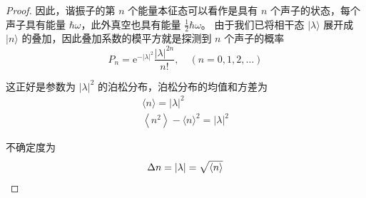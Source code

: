 \begin{proof}
因此，谐振子的第 $n$ 个能量本征态可以看作是具有 $n$ 个声子的状态，每个声子具有能量 $\hbar \omega$，此外真空也具有能量 $\frac{1}{2} \hbar \omega$。
由于我们已将相干态 $|\lambda\rangle$ 展开成 $|n\rangle$ 的叠加，因此叠加系数的模平方就是探测到 $n$ 个声子的概率
$$P_{n}=\mathrm{e}^{-|\lambda|^{2}} \frac{|\lambda|^{2n}}{n!}, \quad(n=0,1,2, \ldots)$$

这正好是参数为 $|\lambda|^{2}$ 的泊松分布，泊松分布的均值和方差为
$$
\begin{gathered}
\langle n\rangle=|\lambda|^{2} \\
\left\langle n^{2}\right\rangle-\langle n\rangle^{2}=|\lambda|^{2}
\end{gathered}
$$

不确定度为
$$\Delta n=|\lambda|=\sqrt{\langle n\rangle}\qedhere$$
\end{proof}
